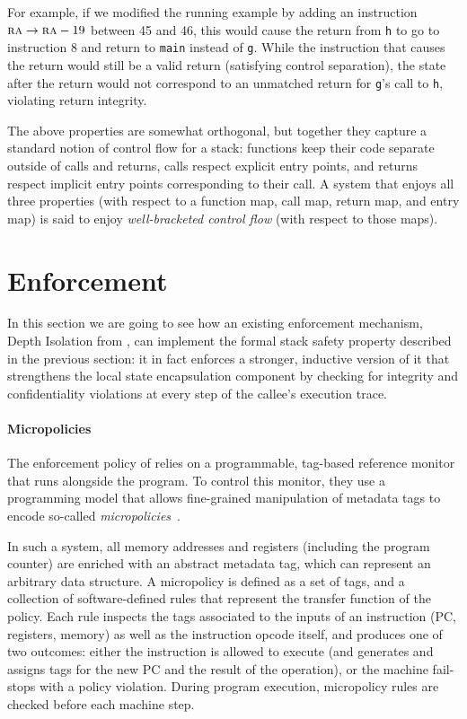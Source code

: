 \documentclass[acmsmall,review,anonymous]{acmart}\settopmatter{printfolios=true,printccs=false,printacmref=false}
\begin{document}
For example, if we modified the running example by adding
an instruction $ \textsc{ra} \rightarrow \textsc{ra} - 19$
between 45 and 46, this would cause the return from {\tt h} to go to instruction 8 and
return to {\tt main} instead of {\tt g}. While the instruction that
causes the return would still be a valid return (satisfying control
separation), the state after the return would not correspond to an
unmatched return for {\tt g}'s call to {\tt h}, violating return
integrity.


The above properties are somewhat orthogonal, but together they
capture a standard notion of control flow for a stack: functions keep
their code separate outside of calls and returns, calls respect
explicit entry points, and returns respect implicit entry points
corresponding to their call.  A system that enjoys all three
properties (with respect to a function map, call map, return map,
and entry map) is said to enjoy
{\em well-bracketed control flow} (with respect to those maps).


\section{Enforcement}
\label{sec:enforcement}

In this section we are going to see how an existing enforcement mechanism,
Depth Isolation from \citet{DBLP:conf/sp/RoesslerD18}, can implement
the formal stack safety property described in the previous section: it in
fact enforces a stronger, inductive version of it that strengthens the
local state encapsulation component by checking for integrity and
confidentiality violations at every step of the callee's execution trace.

\paragraph*{Micropolicies}
%
The enforcement policy of \citeauthor{DBLP:conf/sp/RoesslerD18} relies
on a programmable, tag-based reference monitor that runs alongside the
program.  To control this monitor, they use a programming model that
allows fine-grained manipulation of metadata tags to encode so-called
\emph{micropolicies}~\citep{pump_oakland2015}.

In such a system, all memory addresses and registers (including the program
counter) are enriched with an abstract metadata tag, which can represent an
arbitrary data structure. A micropolicy is defined as a set of tags, and a
collection of software-defined rules that represent the transfer function of the
policy. Each rule inspects the tags associated to the inputs of an instruction
(PC, registers, memory) as well as the instruction opcode itself, and produces
one of two outcomes: either the instruction is allowed to execute (and generates
and assigns tags for the new PC and the result of the operation), or the machine
fail-stops with a policy violation. During program execution, micropolicy rules
are checked before each machine step.
\end{document}
